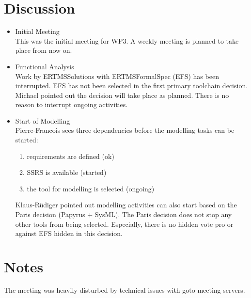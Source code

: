 \documentclass[a4paper, 11pt]{article}
\begin{document}
\section{Discussion}
\begin{itemize}

\item Initial Meeting\\
This was the initial meeting for WP3. A weekly meeting is planned to take place from now on.
\item Functional Analysis\\
Work by ERTMSSolutions with ERTMSFormalSpec (EFS) has been interrupted. EFS has not been selected in the first primary toolchain decision. Michael pointed out the decision will take place as planned. There is no reason to interrupt ongoing activities.  
\item Start of Modelling\\
Pierre-Francois sees three dependencies before the modelling tasks can be started:
\begin{enumerate}
\item requirements are defined (ok)
\item SSRS is available (started)
\item the tool for modelling is selected (ongoing)
\end{enumerate}
Klaus-R\"udiger pointed out modelling activities can also start based on the Paris decision (Papyrus + SysML). The Paris decision does not stop any other tools from being selected. Especially, there is no hidden vote pro or against EFS hidden in this decision.
\end{itemize}


\section{Notes}
The meeting was heavily disturbed by technical issues with goto-meeting servers.
\end{document}
